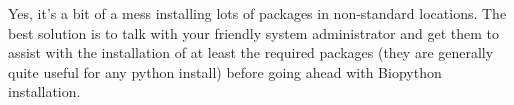 \documentclass{article}
\begin{document}
Yes, it's a bit of a mess installing lots of packages in non-standard
locations. The best solution is to talk with your friendly system
administrator and get them to assist with the installation of at least
the required packages (they are generally quite useful for any python
install) before going ahead with Biopython installation.
\end{document}
